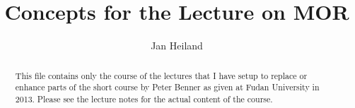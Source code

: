 \documentclass[a4paper,10pt]{article}
\title{Concepts for the Lecture on MOR}
\author{Jan Heiland}
\theoremstyle{definition}
\begin{document}
\maketitle
\begin{abstract}
	This file contains only the course of the lectures that I have setup to replace or enhance parts of the short course by Peter Benner as given at Fudan University in 2013. Please see the lecture notes for the actual content of the course.
\end{abstract}
\tableofcontents



% 




\end{document}
